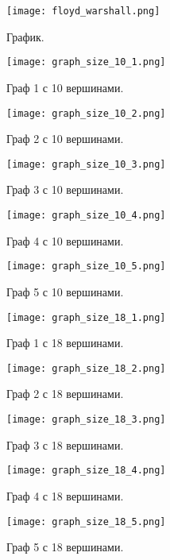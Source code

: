 \documentclass[12pt, a4paper]{report}
\begin{document}
	\newpage
	\vfill

	\begin{figure}[h]
		\centering
		\texttt{[image: floyd\_warshall.png]}
		\caption{График.}
	\end{figure}

	\begin{figure}[h]
		\centering
		\texttt{[image: graph\_size\_10\_1.png]}
		\caption{Граф 1 с 10 вершинами.}
	\end{figure}
	\begin{figure}[h]
		\centering
		\texttt{[image: graph\_size\_10\_2.png]}
		\caption{Граф 2 с 10 вершинами.}
	\end{figure}
	\begin{figure}[h]
		\centering
		\texttt{[image: graph\_size\_10\_3.png]}
		\caption{Граф 3 с 10 вершинами.}
	\end{figure}
	\begin{figure}[h]
		\centering
		\texttt{[image: graph\_size\_10\_4.png]}
		\caption{Граф 4 с 10 вершинами.}
	\end{figure}
	\begin{figure}[h]
		\centering
		\texttt{[image: graph\_size\_10\_5.png]}
		\caption{Граф 5 с 10 вершинами.}
	\end{figure} 

	\begin{figure}[h]
		\centering
		\texttt{[image: graph\_size\_18\_1.png]}
		\caption{Граф 1 с 18 вершинами.}
	\end{figure}
	\begin{figure}[h]
		\centering
		\texttt{[image: graph\_size\_18\_2.png]}
		\caption{Граф 2 с 18 вершинами.}
	\end{figure}
	\begin{figure}[h]
		\centering
		\texttt{[image: graph\_size\_18\_3.png]}
		\caption{Граф 3 с 18 вершинами.}
	\end{figure}
	\begin{figure}[h]
		\centering
		\texttt{[image: graph\_size\_18\_4.png]}
		\caption{Граф 4 с 18 вершинами.}
	\end{figure}
	\begin{figure}[h]
		\centering
		\texttt{[image: graph\_size\_18\_5.png]}
		\caption{Граф 5 с 18 вершинами.}
	\end{figure} 
\end{document}
